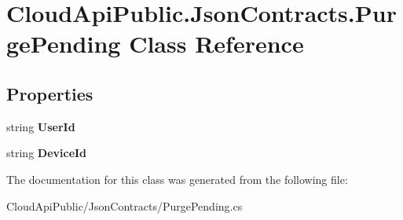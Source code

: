 \hypertarget{class_cloud_api_public_1_1_json_contracts_1_1_purge_pending}{\section{Cloud\-Api\-Public.\-Json\-Contracts.\-Purge\-Pending Class Reference}
\label{class_cloud_api_public_1_1_json_contracts_1_1_purge_pending}
}
\subsection*{Properties}
\begin{DoxyCompactItemize}
\item 
\hypertarget{class_cloud_api_public_1_1_json_contracts_1_1_purge_pending_a3d720870fa0ff409e56649d7b4a9886c}{string {\bfseries User\-Id}}\label{class_cloud_api_public_1_1_json_contracts_1_1_purge_pending_a3d720870fa0ff409e56649d7b4a9886c}

\item 
\hypertarget{class_cloud_api_public_1_1_json_contracts_1_1_purge_pending_ab70c0f50dc8d4866cec7c5624578cf40}{string {\bfseries Device\-Id}}\label{class_cloud_api_public_1_1_json_contracts_1_1_purge_pending_ab70c0f50dc8d4866cec7c5624578cf40}

\end{DoxyCompactItemize}


The documentation for this class was generated from the following file\-:\begin{DoxyCompactItemize}
\item 
Cloud\-Api\-Public/\-Json\-Contracts/Purge\-Pending.\-cs\end{DoxyCompactItemize}
